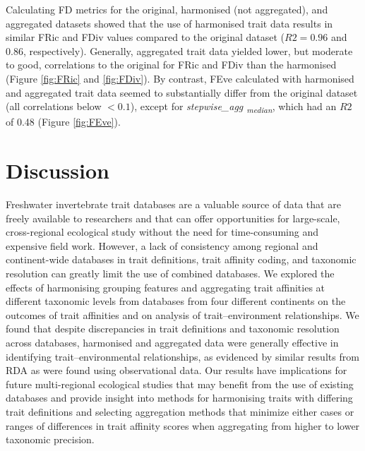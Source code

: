 \documentclass[12pt]{article}
\begin{document}
Calculating FD metrics for the original, harmonised (not aggregated), and aggregated datasets showed that the use of harmonised trait data results in similar FRic and FDiv values compared to the original dataset ($R2 = 0.96$ and $0.86$, respectively). Generally, aggregated trait data yielded lower, but moderate to good, correlations to the original for FRic and FDiv than the harmonised (Figure \ref{fig:FRic} and \ref{fig:FDiv}). 
By contrast, FEve calculated with harmonised and aggregated trait data seemed to substantially differ from the original dataset (all correlations below $< 0.1$), except for \textit{stepwise\_agg \textsubscript{median}}, which had an $R2$ of 0.48 (Figure \ref{fig:FEve}).  




\newpage


\section*{Discussion}

Freshwater invertebrate trait databases are a valuable source of data that are freely available to researchers and that can offer opportunities for large-scale, cross-regional ecological study without the need for time-consuming and expensive field work. However, a lack of consistency among regional and continent-wide databases in trait definitions, trait affinity coding, and taxonomic resolution can greatly limit the use of combined databases. We explored the effects of harmonising grouping features and aggregating trait affinities at different taxonomic levels from databases from four different continents on the outcomes of trait affinities and on analysis of trait–environment relationships. We found that despite discrepancies in trait definitions and taxonomic resolution across databases, harmonised and aggregated data were generally effective in identifying trait–environmental relationships, as evidenced by similar results from RDA as were found using observational data. Our results have implications for future multi-regional ecological studies that may benefit from the use of existing databases and provide insight into methods for harmonising traits with differing trait definitions and selecting aggregation methods that minimize either cases or ranges of differences in trait affinity scores when aggregating from higher to lower taxonomic precision.
\end{document}
